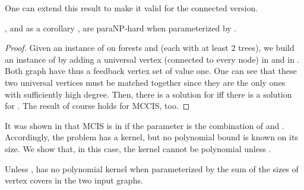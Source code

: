One can extend this result to make it valid for the connected version.

\begin{theorem}\label{th:fvsone}
\icsi, and as a corollary \mccis, are paraNP-hard when parameterized by .
\end{theorem}


\begin{proof}
  Given an instance of \isi on forests  and  (each with at least 2 trees), we build an instance of \icsi by adding a universal vertex (connected to every node) in  and in .
  Both graph have thus a feedback vertex set of value one.
  One can see that these two universal vertices must be matched together since they are the only ones with sufficiently high degree.
  Then, there is a solution for \isi iff there is a solution for \icsi. 
The result of course holds for MCCIS, too.
\end{proof}












\medskip







It was shown in \cite{AbuKhzam2014} that MCIS is in  if the parameter is the combination of  and . Accordingly, the problem has a kernel, but no polynomial bound is known on its size. We show that, in this case,
the kernel cannot be polynomial unless .


\begin{theorem}\label{th:no poly kernel}
Unless , \mcis has no polynomial kernel when parameterized by the sum of the sizes of vertex covers in the two input graphs.
\end{theorem}

